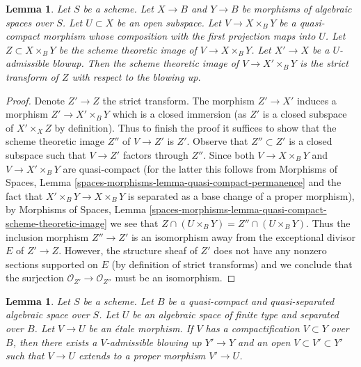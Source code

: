 \documentclass[10pt,a4paper]{amsart}
\theoremstyle{plain}
\newtheorem{lemma}[subsection]{Lemma}
\theoremstyle{definition}
\theoremstyle{remark}
\numberwithin{equation}{subsection}
\begin{document}
\begin{lemma}
\label{lemma-replaced-by-strict-transform}
Let $S$ be a scheme. Let $X \to B$ and $Y \to B$ be morphisms of
algebraic spaces over $S$. Let $U \subset X$ be an open subspace.
Let $V \to X \times_B Y$ be a quasi-compact morphism
whose composition with the first projection maps into $U$.
Let $Z \subset X \times_B Y$ be the scheme theoretic image of
$V \to X \times_B Y$. Let $X' \to X$ be a $U$-admissible blowup.
Then the scheme theoretic image of $V \to X' \times_B Y$ is the
strict transform of $Z$ with respect to the blowing up.
\end{lemma}

\begin{proof}
Denote $Z' \to Z$ the strict transform. The morphism $Z' \to X'$
induces a morphism $Z' \to X' \times_B Y$ which is a closed immersion
(as $Z'$ is a closed subspace of $X' \times_X Z$ by definition).
Thus to finish the proof it suffices to show that the scheme theoretic
image $Z''$ of $V \to Z'$ is $Z'$. Observe that $Z'' \subset Z'$
is a closed subspace such that $V \to Z'$ factors through $Z''$.
Since both $V \to X \times_B Y$ and $V \to X' \times_B Y$ are
quasi-compact (for the latter this follows from Morphisms of Spaces, Lemma
\ref{spaces-morphisms-lemma-quasi-compact-permanence}
and the fact that $X' \times_B Y \to X \times_B Y$ is separated
as a base change of a proper morphism), by Morphisms of Spaces, Lemma
\ref{spaces-morphisms-lemma-quasi-compact-scheme-theoretic-image}
we see that $Z \cap (U \times_B Y) = Z'' \cap (U \times_B Y)$.
Thus the inclusion morphism $Z'' \to Z'$ is an isomorphism
away from the exceptional divisor $E$ of $Z' \to Z$. However, the
structure sheaf of $Z'$ does not have any nonzero sections supported
on $E$ (by definition of strict transforms) and we conclude that
the surjection $\mathcal{O}_{Z'} \to \mathcal{O}_{Z''}$ must be an isomorphism.
\end{proof}

\begin{lemma}
\label{lemma-compactification-dominates}
Let $S$ be a scheme. Let $B$ be a quasi-compact and quasi-separated
algebraic space over $S$. Let $U$ be an algebraic space
of finite type and separated over $B$. Let $V \to U$ be an \'etale morphism.
If $V$ has a compactification $V \subset Y$ over $B$, then there
exists a $V$-admissible blowing up $Y' \to Y$ and an
open $V \subset V' \subset Y'$ such that $V \to U$
extends to a proper morphism $V' \to U$.
\end{lemma}
\end{document}

